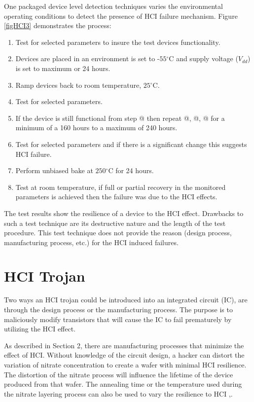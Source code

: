 \documentclass[12pt,conference]{IEEEtran}
\makeatletter
\newcommand{\degree}{\ensuremath{^\circ}}
\newcommand{\Rmnum}[1]{\expandafter\@slowromancap\romannumeral #1@}
\makeatother
\begin{document}
One packaged device level detection techniques varies the environmental operating conditions to detect the presence of HCI failure mechanism.  Figure \ref{figHCI3} demonstrates the process: 
\begin{comment}
\newcounter{Lcount}
\begin{list}{\Roman{Lcount}.}
{\usecounter{Lcount}
\setlength{\rightmargin}{\leftmargin}}


\end{comment}
\renewcommand{\labelenumi}{\Roman{enumi}.}
\begin{enumerate}
\item Test for selected parameters to insure the test devices functionality.
\item Devices are placed in an environment is set to -$55\degree$C  and supply voltage ($V_{dd}$) is set to maximum or 24 hours.
\item Ramp devices back to room temperature, $25\degree$C.
\item Test for selected parameters.
\item If the device is still functional from step \Rmnum{5} then repeat \Rmnum{2}, \Rmnum{3}, \Rmnum{4} for a minimum of a 160 hours to a maximum of 240 hours.
\item Test for selected parameters and if there is a significant change this suggests HCI failure.
\item Perform unbiased bake at $250\degree$C for 24 hours.
\item Test at room temperature, if full or partial recovery in the monitored parameters is achieved then the failure was due to the HCI effects. 
\end{enumerate}
 The test results show the resilience of a device to the HCI effect.  Drawbacks to such a test technique are its destructive nature and the length of the test procedure.  This test technique does not provide the reason (design process, manufacturing process, etc.) for  the HCI induced failures.  
 

\section*{HCI Trojan}
Two ways an HCI trojan could be introduced into an integrated circuit (IC), are through the design process or the manufacturing process.  The purpose is to maliciously modify transistors that will cause the IC to fail prematurely by utilizing the HCI effect. 


As described in Section 2, there are manufacturing processes that minimize the effect of HCI.  Without knowledge of the circuit design, a hacker can distort the variation of nitrate concentration to create a wafer with minimal HCI resilience.  The distortion of the nitrate process will influence the lifetime of the device produced from that wafer.   The annealing time or the temperature used during the nitrate layering process can also be used to vary the resilience to HCI \cite{NOX92A},\cite{IEDM95}.      
\end{document}
